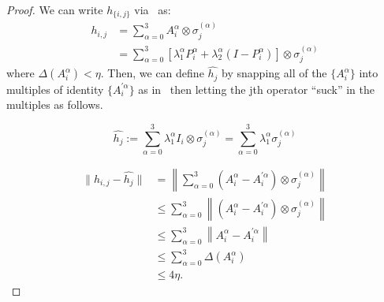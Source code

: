 \documentclass[11pt]{article}
\theoremstyle{plain}
\begin{document}
\begin{proof}
We can write $h_{\{i,j\}}$ via~ as:
    \begin{align*}
        h_{i,j}& = \sum\limits_{\alpha = 0}^{3} A_{i}^{\alpha} \otimes \sigma_{j}^{(\alpha)}\\
        &= \sum\limits_{\alpha = 0}^{3} \left[\lambda_1^{\alpha} P_{i}^{\alpha} + \lambda_2^{\alpha} \left(I - P_{i}^{\alpha}\right)\right] \otimes \sigma_{j}^{(\alpha)}
    \end{align*}
where $\Delta(A_{i}^{\alpha}) < \eta$. Then, we can define $\widehat{h_j}$ by snapping all of the $\{A_i^{\alpha}\}$ into multiples of identity $\{A_i^{'\alpha}\}$ as in~ then letting the jth operator ``suck'' in the multiples as follows.

\begin{equation}
    \widehat{h_j} := \sum\limits_{\alpha = 0}^{3} \lambda_1^{\alpha} I_{i} \otimes \sigma_{j}^{(\alpha)} = \sum\limits_{\alpha = 0}^{3} \lambda_1^{\alpha} \sigma_{j}^{(\alpha)}
\end{equation}

\begin{align*}
    \|h_{i,j} - \widehat{h_{j}}\| &= \left\|\sum\limits_{\alpha = 0}^{3} \left( A_i^{\alpha} - A_i^{'\alpha} \right)\otimes \sigma_{j}^{(\alpha)}\right\|\\
    &\leq \sum\limits_{\alpha = 0}^{3} \left\|\left( A_i^{\alpha} - A_i^{'\alpha} \right)\otimes \sigma_{j}^{(\alpha)} \right\|\\
    &\leq \sum\limits_{\alpha = 0}^{3} \left\| A_i^{\alpha} - A_i^{'\alpha}  \right\|\\
    &\leq \sum\limits_{\alpha = 0}^{3} \Delta(A_{i}^{\alpha})\\
    &\leq 4 \eta.
\end{align*}
\end{proof}
\end{document}
